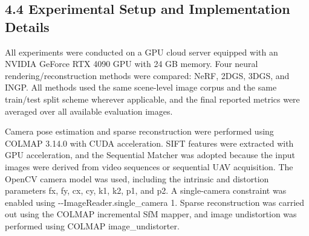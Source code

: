 \subsection{4.4 Experimental Setup and
Implementation
Details}\label{experimental-setup-and-implementation-details}

All experiments were conducted on a GPU cloud server equipped with
an NVIDIA GeForce RTX 4090 GPU with 24 GB memory. Four neural
rendering/reconstruction methods were compared: NeRF, 2DGS, 3DGS, and
INGP. All methods used the same scene-level image corpus and the same
train/test split scheme wherever applicable, and the final reported
metrics were averaged over all available evaluation images.

Camera pose estimation and sparse reconstruction were performed
using COLMAP 3.14.0 with CUDA acceleration. SIFT features were extracted
with GPU acceleration, and the Sequential Matcher was adopted because
the input images were derived from video sequences or sequential UAV
acquisition. The OpenCV camera model was used, including the intrinsic
and distortion parameters fx, fy, cx, cy, k1, k2, p1, and p2. A
single-camera constraint was enabled using
-\/-ImageReader.single\_camera 1. Sparse reconstruction was carried out
using the COLMAP incremental SfM mapper, and image undistortion was
performed using COLMAP image\_undistorter.

